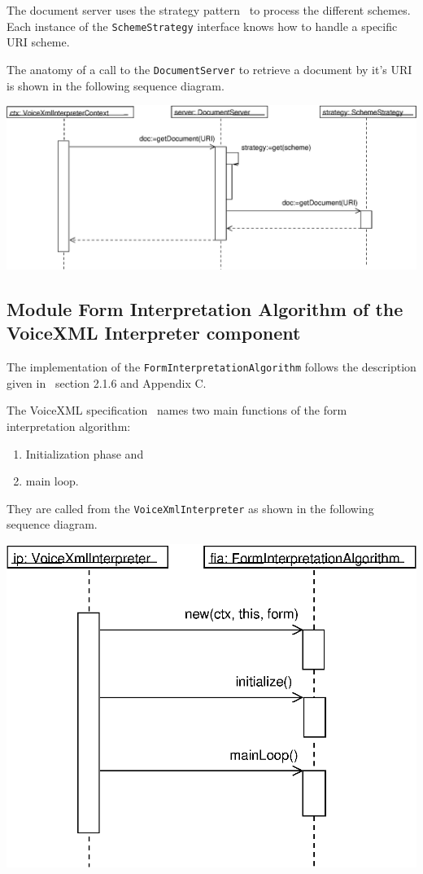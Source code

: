 \documentclass[11pt,a4paper]{article}
\begin{document}
The document server uses the strategy pattern~\cite{gamma:design_patterns} 
to process the different schemes.
Each instance of the \texttt{SchemeStrategy} interface knows how
to handle a specific URI scheme.

The anatomy of a call to the \texttt{DocumentServer} to retrieve a
document by it's URI is shown in the following sequence diagram.

\begin{center}
\includegraphics[scale=0.5]{seq-documentserver.eps}
\end{center}

\subsection{Module Form Interpretation Algorithm of the VoiceXML Interpreter 
component}
\label{sec:module-form-interpr}

The implementation of the \texttt{FormInterpretationAlgorithm} 
follows the description given in~\cite{w3.org:voicexml} section 2.1.6
and Appendix C.

The VoiceXML specification~\cite{w3.org:voicexml} names two main
functions of the form interpretation algorithm:
\begin{enumerate}
\item Initialization phase and
\item main loop.
\end{enumerate}

They are called from the \texttt{VoiceXmlInterpreter} as shown in the
following sequence diagram.

\begin{center}
\includegraphics[scale=0.7]{seq-interpreter-fia.eps}
\end{center}
\end{document}
